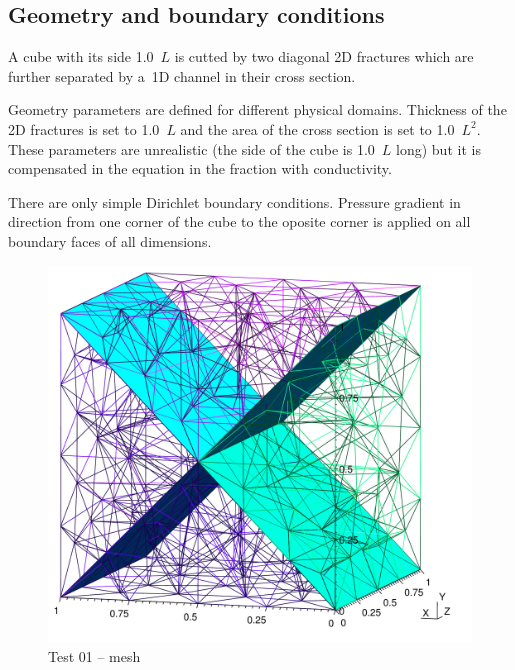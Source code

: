 \subsection*{Geometry and boundary conditions}
A cube with its side 1.0~$L$ is cutted by two diagonal 2D fractures which are further separated by a~1D channel in their cross section.

Geometry parameters are defined for different physical domains. Thickness of the 2D fractures is set to 1.0~$L$ and the area of the cross section is set to 1.0~$L^2$. These parameters are unrealistic (the side of the cube is 1.0~$L$ long) but it is compensated in the equation in the fraction with conductivity.

There are only simple Dirichlet boundary conditions. Pressure gradient in direction from one corner of the cube to the oposite corner is applied on all boundary faces of all dimensions.
%
\begin{figure}[htb!]
\centering
\includegraphics[width=13cm]{tests_graphics/01_mesh.pdf}
\caption{Test 01 -- mesh}
\label{fig:test13_mesh}
\end{figure}
%
%
